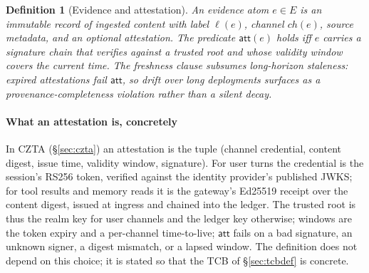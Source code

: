 \documentclass[conference,compsoc]{IEEEtran}
\newtheorem{definition}{Definition}
\theoremstyle{definition}
\theoremstyle{plain}
\newcommand{\att}{\ensuremath{\mathsf{att}}}
\begin{document}
\begin{definition}[Evidence and attestation]
\label{def:evidence}
An \emph{evidence atom} $e \in E$ is an immutable record of ingested
content with label $\ell(e)$, channel $\mathit{ch}(e)$, source metadata,
and an optional attestation. The predicate $\att(e)$ holds iff $e$
carries a signature chain that verifies against a trusted root and
whose validity window covers the current time. The freshness clause
subsumes long-horizon staleness: expired attestations fail $\att$, so
drift over long deployments surfaces as a provenance-completeness
violation rather than a silent decay.
\end{definition}

\paragraph*{What an attestation is, concretely}
In CZTA (\S\ref{sec:czta}) an attestation is the tuple (channel
credential, content digest, issue time, validity window, signature).
For user turns the credential is the session's RS256 token, verified
against the identity provider's published JWKS; for tool results and
memory reads it is the gateway's Ed25519 receipt over the content
digest, issued at ingress and chained into the ledger. The trusted root
is thus the realm key for user channels and the ledger key otherwise;
windows are the token expiry and a per-channel time-to-live; $\att$
fails on a bad signature, an unknown signer, a digest mismatch, or a
lapsed window. The definition does not depend on this choice; it is
stated so that the TCB of \S\ref{sec:tcbdef} is concrete.
\end{document}
